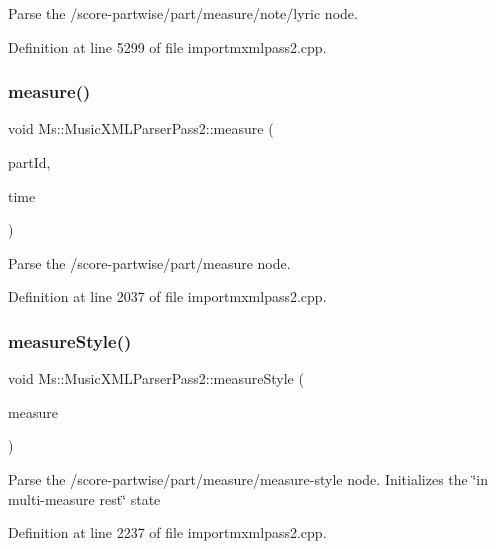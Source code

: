 Parse the /score-\/partwise/part/measure/note/lyric node. 

Definition at line 5299 of file importmxmlpass2.\+cpp.

\mbox{\label{class_ms_1_1_music_x_m_l_parser_pass2_a0a37fd1f0a5c962fed1c843c00de07aa}} 
\subsubsection{\texorpdfstring{measure()}{measure()}}
{\footnotesize\ttfamily void Ms\+::\+Music\+X\+M\+L\+Parser\+Pass2\+::measure (\begin{DoxyParamCaption}\item[{const Q\+String \&}]{part\+Id,  }\item[{const \hyperlink{class_ms_1_1_fraction}{Fraction}}]{time }\end{DoxyParamCaption})}

Parse the /score-\/partwise/part/measure node. 

Definition at line 2037 of file importmxmlpass2.\+cpp.

\mbox{\label{class_ms_1_1_music_x_m_l_parser_pass2_a68076147c3375916ebceb86db3c51456}} 
\subsubsection{\texorpdfstring{measure\+Style()}{measureStyle()}}
{\footnotesize\ttfamily void Ms\+::\+Music\+X\+M\+L\+Parser\+Pass2\+::measure\+Style (\begin{DoxyParamCaption}\item[{\hyperlink{class_ms_1_1_measure}{Measure} $\ast$}]{measure }\end{DoxyParamCaption})}

Parse the /score-\/partwise/part/measure/measure-\/style node. Initializes the \char`\"{}in multi-\/measure rest\char`\"{} state 

Definition at line 2237 of file importmxmlpass2.\+cpp.

